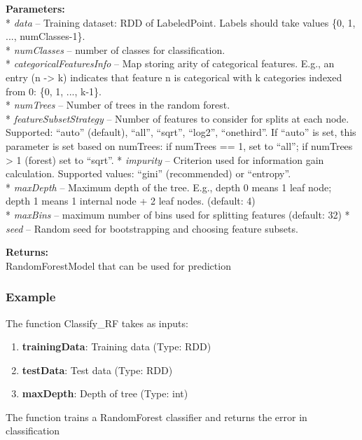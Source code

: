 \documentclass[11pt]{article}
\providecommand{\tightlist}{%
      \setlength{\itemsep}{0pt}\setlength{\parskip}{0pt}}
\begin{document}
\textbf{Parameters:}\\
* \emph{data} -- Training dataset: RDD of LabeledPoint. Labels should
take values \{0, 1, ..., numClasses-1\}.\\
* \emph{numClasses} -- number of classes for classification.\\
* \emph{categoricalFeaturesInfo} -- Map storing arity of categorical
features. E.g., an entry (n -\textgreater{} k) indicates that feature n
is categorical with k categories indexed from 0: \{0, 1, ..., k-1\}.\\
* \emph{numTrees} -- Number of trees in the random forest.\\
* \emph{featureSubsetStrategy} -- Number of features to consider for
splits at each node. Supported: ``auto'' (default), ``all'', ``sqrt'',
``log2'', ``onethird''. If ``auto'' is set, this parameter is set based
on numTrees: if numTrees == 1, set to ``all''; if numTrees
\textgreater{} 1 (forest) set to ``sqrt''. * \emph{impurity} --
Criterion used for information gain calculation. Supported values:
``gini'' (recommended) or ``entropy''.\\
* \emph{maxDepth} -- Maximum depth of the tree. E.g., depth 0 means 1
leaf node; depth 1 means 1 internal node + 2 leaf nodes. (default: 4)\\
* \emph{maxBins} -- maximum number of bins used for splitting features
(default: 32) * \emph{seed} -- Random seed for bootstrapping and
choosing feature subsets.

\textbf{Returns:}\\
RandomForestModel that can be used for prediction

    \subsubsection{Example}\label{example}

The function Classify\_RF takes as inputs:

\begin{enumerate}
\def\labelenumi{\arabic{enumi}.}
\tightlist
\item
  \textbf{trainingData}: Training data (Type: RDD)
\item
  \textbf{testData}: Test data (Type: RDD)
\item
  \textbf{maxDepth}: Depth of tree (Type: int)
\end{enumerate}

The function trains a RandomForest classifier and returns the error in
classification
\end{document}
